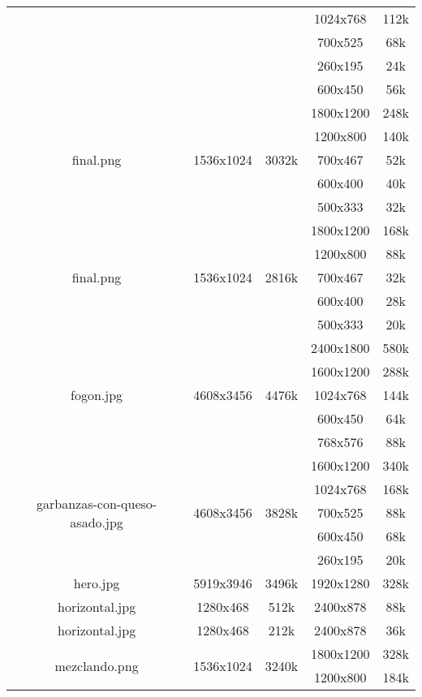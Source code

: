 \documentclass{article}
\begin{document}
\begin{longtable}{c|c|c|c|c}
     &  &  & 1024x768 & 112k \\
     &  &  & 700x525 & 68k \\
     &  &  & 260x195 & 24k \\
     &  &  & 600x450 & 56k \\
    \hline
    \multirow{5}{*}{final.png} & \multirow{5}{*}{1536x1024} & \multirow{5}{*}{3032k} & 1800x1200 & 248k \\
     &  &  & 1200x800 & 140k \\
     &  &  & 700x467 & 52k \\
     &  &  & 600x400 & 40k \\
     &  &  & 500x333 & 32k \\
    \hline
    \multirow{5}{*}{final.png} & \multirow{5}{*}{1536x1024} & \multirow{5}{*}{2816k} & 1800x1200 & 168k \\
     &  &  & 1200x800 & 88k \\
     &  &  & 700x467 & 32k \\
     &  &  & 600x400 & 28k \\
     &  &  & 500x333 & 20k \\
    \hline
    \multirow{5}{*}{fogon.jpg} & \multirow{5}{*}{4608x3456} & \multirow{5}{*}{4476k} & 2400x1800 & 580k \\
     &  &  & 1600x1200 & 288k \\
     &  &  & 1024x768 & 144k \\
     &  &  & 600x450 & 64k \\
     &  &  & 768x576 & 88k \\
    \hline
    \multirow{5}{*}{garbanzas-con-queso-asado.jpg} & \multirow{5}{*}{4608x3456} & \multirow{5}{*}{3828k} & 1600x1200 & 340k \\
     &  &  & 1024x768 & 168k \\
     &  &  & 700x525 & 88k \\
     &  &  & 600x450 & 68k \\
     &  &  & 260x195 & 20k \\
    \hline
    hero.jpg & 5919x3946 & 3496k & 1920x1280 & 328k \\
    \hline
    horizontal.jpg & 1280x468 & 512k & 2400x878 & 88k \\
    \hline
    horizontal.jpg & 1280x468 & 212k & 2400x878 & 36k \\
    \hline
    \multirow{5}{*}{mezclando.png} & \multirow{5}{*}{1536x1024} & \multirow{5}{*}{3240k} & 1800x1200 & 328k \\
     &  &  & 1200x800 & 184k \\

\end{longtable}
\end{document}
